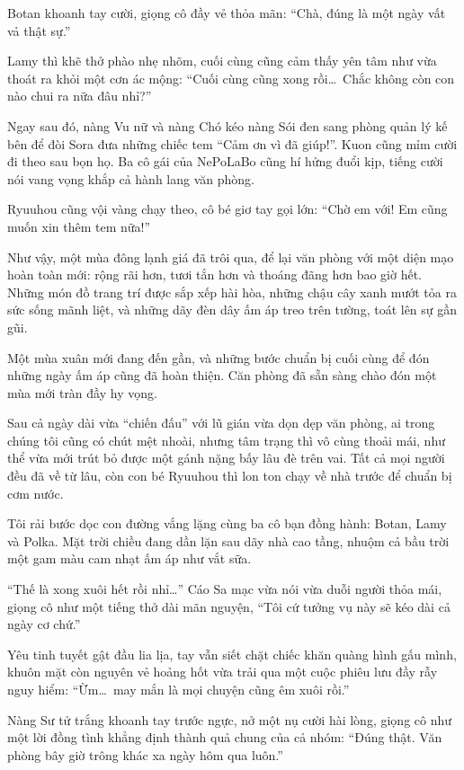 \documentclass[../main.tex]{subfiles}
\begin{document}
Botan khoanh tay cười, giọng cô đầy vẻ thỏa mãn: ``Chà, đúng là một ngày vất vả thật sự.''

Lamy thì khẽ thở phào nhẹ nhõm, cuối cùng cũng cảm thấy yên tâm như vừa thoát ra khỏi một cơn ác mộng: ``Cuối cùng cũng xong rồi\dots\ Chắc không còn con nào chui ra nữa đâu nhỉ?''

Ngay sau đó, nàng Vu nữ và nàng Chó kéo nàng Sói đen sang phòng quản lý kế bên để đòi Sora đưa những chiếc tem ``Cảm ơn vì đã giúp!''. Kuon cũng mỉm cười đi theo sau bọn họ. Ba cô gái của NePoLaBo cũng hí hửng đuổi kịp, tiếng cười nói vang vọng khắp cả hành lang văn phòng.

Ryuuhou cũng vội vàng chạy theo, cô bé giơ tay gọi lớn: ``Chờ em với! Em cũng muốn xin thêm tem nữa!''

Như vậy, một mùa đông lạnh giá đã trôi qua, để lại văn phòng với một diện mạo hoàn toàn mới: rộng rãi hơn, tươi tắn hơn và thoáng đãng hơn bao giờ hết. Những món đồ trang trí được sắp xếp hài hòa, những chậu cây xanh mướt tỏa ra sức sống mãnh liệt, và những dãy đèn dây ấm áp treo trên tường, toát lên sự gần gũi.

Một mùa xuân mới đang đến gần, và những bước chuẩn bị cuối cùng để đón những ngày ấm áp cũng đã hoàn thiện. Căn phòng đã sẵn sàng chào đón một mùa mới tràn đầy hy vọng.

\il


Sau cả ngày dài vừa ``chiến đấu'' với lũ gián vừa dọn dẹp văn phòng, ai trong chúng tôi cũng có chút mệt nhoài, nhưng tâm trạng thì vô cùng thoải mái, như thể vừa mới trút bỏ được một gánh nặng bấy lâu đè trên vai. Tất cả mọi người đều đã về từ lâu, còn con bé Ryuuhou thì lon ton chạy về nhà trước để chuẩn bị cơm nước.

Tôi rải bước dọc con đường vắng lặng cùng ba cô bạn đồng hành: Botan, Lamy và Polka. Mặt trời chiều đang dần lặn sau dãy nhà cao tầng, nhuộm cả bầu trời một gam màu cam nhạt ấm áp như vắt sữa.

``Thế là xong xuôi hết rồi nhỉ\dots'' Cáo Sa mạc vừa nói vừa duỗi người thỏa mái, giọng cô như một tiếng thở dài mãn nguyện, ``Tôi cứ tưởng vụ này sẽ kéo dài cả ngày cơ chứ.''

Yêu tinh tuyết gật đầu lia lịa, tay vẫn siết chặt chiếc khăn quàng hình gấu mình, khuôn mặt còn nguyên vẻ hoảng hốt vừa trải qua một cuộc phiêu lưu đầy rẫy nguy hiểm: ``Ừm\dots\ may mắn là mọi chuyện cũng êm xuôi rồi.''

Nàng Sư tử trắng khoanh tay trước ngực, nở một nụ cười hài lòng, giọng cô như một lời đồng tình khẳng định thành quả chung của cả nhóm: ``Đúng thật. Văn phòng bây giờ trông khác xa ngày hôm qua luôn.''
\end{document}
